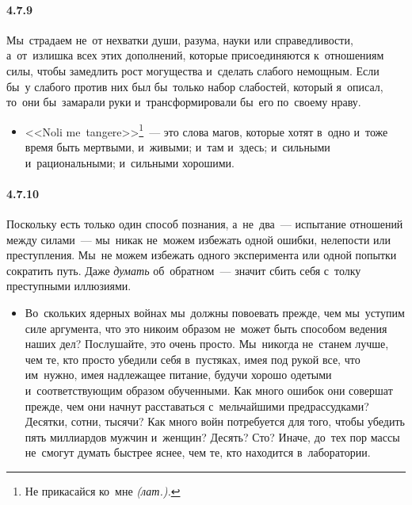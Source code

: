 \paragraph{4.7.9}\hypertarget{par:4.7.9}{} Мы~страдаем не~от нехватки души, разума, науки или справедливости, а~от~излишка всех этих дополнений, которые присоединяются к~отношениям силы, чтобы замедлить рост могущества и~сделать слабого немощным. Если бы~у слабого против них был бы~только набор слабостей, который я~описал, то~они бы~замарали руки и~трансформировали бы~его по~своему нраву. 
	\begin{itemize}
	\item 
	<<Noli me~tangere>>\footnote{Не прикасайся ко~мне {\itshape(лат.).}}~--- это слова магов, которые хотят в~одно и~тоже время быть мертвыми, и~живыми; и~там и~здесь; и~сильными и~рациональными; и~сильными хорошими.
	\end{itemize}	

\paragraph{4.7.10}\hypertarget{par:4.7.10}{}Поскольку есть только один способ познания, а~не~два~--- испытание отношений между силами~--- мы~никак не~можем избежать одной ошибки, нелепости или преступления. Мы~не можем избежать одного эксперимента или одной попытки сократить путь. Даже {\itshape думать} об~обратном~--- значит сбить себя с~толку преступными иллюзиями. 
	\begin{itemize}
	\item 
 Во~скольких ядерных войнах мы~должны повоевать прежде, чем мы~уступим силе аргумента, что это никоим образом не~может быть способом ведения наших дел? Послушайте, это очень просто. Мы~никогда не~станем лучше, чем те, кто просто убедили себя в~пустяках, имея под рукой все, что им~нужно, имея надлежащее питание, будучи хорошо одетыми и~соответствующим образом обученными. Как много ошибок они совершат прежде, чем они начнут расставаться с~мельчайшими предрассудками? Десятки, сотни, тысячи? Как много войн потребуется для того, чтобы убедить пять миллиардов мужчин и~женщин? Десять? Сто? Иначе, до~тех пор массы не~смогут думать быстрее яснее, чем те, кто находится в~лаборатории.
	\end{itemize}	

